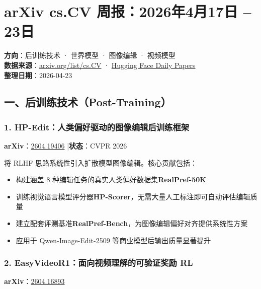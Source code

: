 
\section{arXiv cs.CV 周报：2026年4月17日 – 23日}

\begin{conceptbox}
\textbf{方向}：后训练技术 · 世界模型 · 图像编辑 · 视频模型\\
\textbf{数据来源}：\href{https://arxiv.org/list/cs.CV/2026-04}{arxiv.org/list/cs.CV} · \href{https://huggingface.co/papers}{Hugging Face Daily Papers}\\
\textbf{整理日期}：2026-04-23
\end{conceptbox}

\subsection{一、后训练技术（Post-Training）}

\subsubsection{1. HP-Edit：人类偏好驱动的图像编辑后训练框架}

\textbf{arXiv}：\href{https://arxiv.org/abs/2604.19406}{2604.19406} |\textbf{状态}：CVPR 2026

将 RLHF 思路系统性引入扩散模型图像编辑。核心贡献包括：

\begin{itemize}[leftmargin=1.5em]
  \item 构建涵盖 8 种编辑任务的真实人类偏好数据集\textbf{RealPref-50K}
  \item 训练视觉语言模型评分器\textbf{HP-Scorer}，无需大量人工标注即可自动评估编辑质量
  \item 建立配套评测基准\textbf{RealPref-Bench}，为图像编辑偏好对齐提供系统性方案
  \item 应用于 Qwen-Image-Edit-2509 等商业模型后输出质量显著提升
\end{itemize}

\subsubsection{2. EasyVideoR1：面向视频理解的可验证奖励 RL}

\textbf{arXiv}：\href{https://arxiv.org/abs/2604.16893}{2604.16893}

